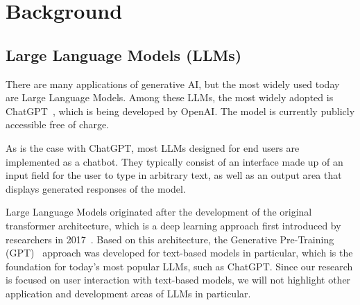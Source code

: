 \section{Background}
\label{sec:background}

\subsection{Large Language Models (LLMs)}
\label{subsec:large-language-models-(llms)}

There are many applications of generative AI, but the most widely used today are Large Language Models.
Among these LLMs, the most widely adopted is ChatGPT~\cite{openai_chatgpt_2023}, which is being
developed by OpenAI\@.
The model is currently publicly accessible free of charge.

As is the case with ChatGPT, most LLMs designed for end users are implemented as a chatbot.
They typically consist of an interface made up of an input field for the user to type in arbitrary text, as well as
an output area that displays generated responses of the model.

Large Language Models originated after the development of the original transformer architecture,
which is a deep learning approach first introduced by researchers in 2017~\cite{vaswani_attention_2017}.
Based on this architecture, the Generative Pre-Training (GPT)~\cite{radford_improving_2018} approach
was developed for text-based models in particular, which is the foundation for today's most popular
LLMs, such as ChatGPT\@.
Since our research is focused on user interaction with text-based models, we will not highlight other
application and development areas of LLMs in particular.


